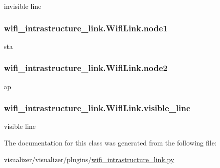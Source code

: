 invisible line 

\subsubsection[{\texorpdfstring{node1}{node1}}]{\setlength{\rightskip}{0pt plus 5cm}wifi\+\_\+intrastructure\+\_\+link.\+Wifi\+Link.\+node1}\hypertarget{classwifi__intrastructure__link_1_1WifiLink_a09f701c48feb76a7326cd9ab0c9e9ef9}{}\label{classwifi__intrastructure__link_1_1WifiLink_a09f701c48feb76a7326cd9ab0c9e9ef9}


sta 

\subsubsection[{\texorpdfstring{node2}{node2}}]{\setlength{\rightskip}{0pt plus 5cm}wifi\+\_\+intrastructure\+\_\+link.\+Wifi\+Link.\+node2}\hypertarget{classwifi__intrastructure__link_1_1WifiLink_ae2a6891c2b8c472b6125b5414b0be1ca}{}\label{classwifi__intrastructure__link_1_1WifiLink_ae2a6891c2b8c472b6125b5414b0be1ca}


ap 

\subsubsection[{\texorpdfstring{visible\+\_\+line}{visible_line}}]{\setlength{\rightskip}{0pt plus 5cm}wifi\+\_\+intrastructure\+\_\+link.\+Wifi\+Link.\+visible\+\_\+line}\hypertarget{classwifi__intrastructure__link_1_1WifiLink_a93c4314f7e592781ef343014db420842}{}\label{classwifi__intrastructure__link_1_1WifiLink_a93c4314f7e592781ef343014db420842}


visible line 



The documentation for this class was generated from the following file\+:\begin{DoxyCompactItemize}
\item 
visualizer/visualizer/plugins/\hyperlink{wifi__intrastructure__link_8py}{wifi\+\_\+intrastructure\+\_\+link.\+py}\end{DoxyCompactItemize}
